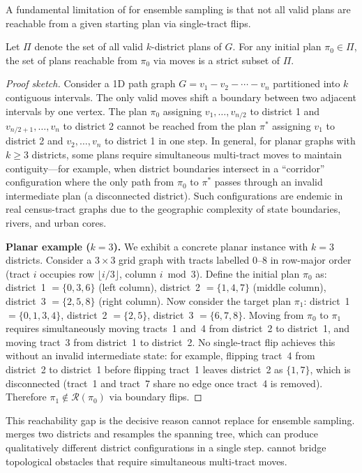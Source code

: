 A fundamental limitation of \flip{} for ensemble sampling is that not all
valid plans are reachable from a given starting plan via single-tract flips.

\begin{theorem}
\label{thm:reachability}
Let $\Pi$ denote the set of all valid $k$-district plans of $G$.
For any initial plan $\pi_0 \in \Pi$, the set of plans reachable from
$\pi_0$ via \flip{} moves is a strict subset of $\Pi$.
\end{theorem}

\begin{proof}[Proof sketch]
Consider a 1D path graph $G = v_1 - v_2 - \cdots - v_n$ partitioned into
$k$ contiguous intervals.
The only valid \flip{} moves shift a boundary between two adjacent intervals
by one vertex.
The plan $\pi_0$ assigning $v_1, \ldots, v_{n/2}$ to district 1 and
$v_{n/2+1}, \ldots, v_n$ to district 2 cannot be reached from the plan
$\pi^*$ assigning $v_1$ to district 2 and $v_2, \ldots, v_n$ to district 1
in one step.
In general, for planar graphs with $k \geq 3$ districts, some plans require
simultaneous multi-tract moves to maintain contiguity---for example, when
district boundaries intersect in a ``corridor'' configuration where the only
path from $\pi_0$ to $\pi^*$ passes through an invalid intermediate plan
(a disconnected district).
Such configurations are endemic in real census-tract graphs due to the
geographic complexity of state boundaries, rivers, and urban cores.

\medskip
\noindent\textbf{Planar example ($k = 3$).}
We exhibit a concrete planar instance with $k = 3$ districts.
Consider a $3 \times 3$ grid graph with tracts labelled $0$--$8$ in
row-major order (tract $i$ occupies row $\lfloor i/3 \rfloor$, column
$i \bmod 3$).
Define the initial plan $\pi_0$ as: district~1 $= \{0, 3, 6\}$ (left
column), district~2 $= \{1, 4, 7\}$ (middle column), district~3 $=
\{2, 5, 8\}$ (right column).
Now consider the target plan $\pi_1$: district~1 $= \{0, 1, 3, 4\}$,
district~2 $= \{2, 5\}$, district~3 $= \{6, 7, 8\}$.
Moving from $\pi_0$ to $\pi_1$ requires simultaneously moving tracts~1
and~4 from district~2 to district~1, and moving tract~3 from district~1
to district~2.
No single-tract flip achieves this without an invalid intermediate
state: for example, flipping tract~4 from district~2 to district~1
before flipping tract~1 leaves district~2 as $\{1, 7\}$, which is
disconnected (tract~1 and tract~7 share no edge once tract~4 is
removed).
Therefore $\pi_1 \notin \mathcal{R}(\pi_0)$ via boundary flips.
\end{proof}

This reachability gap is the decisive reason \flip{} cannot replace \recom{}
for ensemble sampling.
\recom{} merges two districts and resamples the spanning tree, which can
produce qualitatively different district configurations in a single step.
\flip{} cannot bridge topological obstacles that require simultaneous
multi-tract moves.
